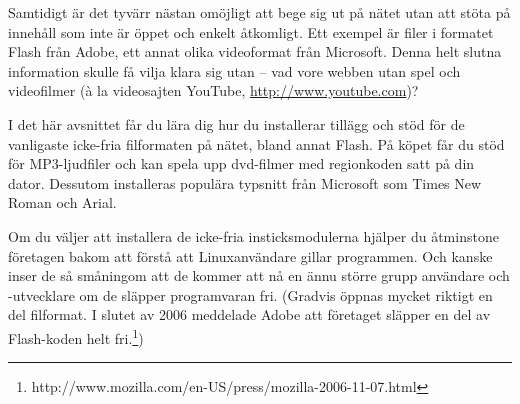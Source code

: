 \documentclass[a4paper,final]{memoir} %
\begin{document}

Samtidigt är det tyvärr nästan omöjligt att bege sig ut på nätet utan att stöta på innehåll som inte är öppet och enkelt åtkomligt. Ett exempel är filer i formatet Flash från Adobe, ett annat olika videoformat från Microsoft. Denna helt slutna information skulle få vilja klara sig utan -- vad vore webben utan spel och videofilmer (à la videosajten YouTube, \url{http://www.youtube.com})?






I det här avsnittet får du lära dig hur du installerar tillägg och stöd för de vanligaste icke-fria filformaten på nätet, bland annat Flash. På köpet får du stöd för MP3-ljudfiler och kan spela upp dvd-filmer med regionkoden satt på din dator. Dessutom installeras populära typsnitt från Microsoft som Times New Roman och Arial.\label{msttcorefonts}

Om du väljer att installera de icke-fria insticksmodulerna hjälper du åtminstone företagen bakom att förstå att Linuxanvändare gillar programmen. Och kanske inser de så småningom att de kommer att nå en ännu större grupp användare och -utvecklare om de släpper programvaran fri. (Gradvis öppnas mycket riktigt en del filformat. I slutet av 2006 meddelade Adobe att företaget släpper en del av Flash-koden helt fri.\footnote{http://www.mozilla.com/en-US/press/mozilla-2006-11-07.html})

\end{document}
